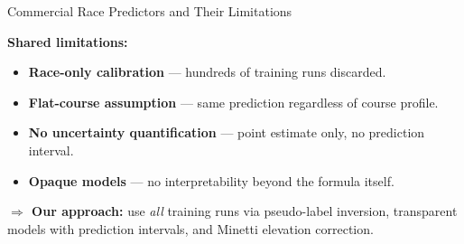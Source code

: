 \documentclass{beamer}
\begin{document}
\begin{frame}{Commercial Race Predictors and Their Limitations}

\begin{center}
\end{center}

\textbf{Shared limitations:}
\begin{itemize}\setlength{\itemsep}{2pt}
    \item \textbf{Race-only calibration} --- hundreds of training runs discarded.
    \item \textbf{Flat-course assumption} --- same prediction regardless of course profile.
    \item \textbf{No uncertainty quantification} --- point estimate only, no prediction interval.
    \item \textbf{Opaque models} --- no interpretability beyond the formula itself.
\end{itemize}

\smallskip

{\small\raggedright\textbf{$\Rightarrow$ Our approach:} use \emph{all} training runs via pseudo-label inversion, transparent models with prediction intervals, and Minetti elevation correction.\par}

\end{frame}
\end{document}
